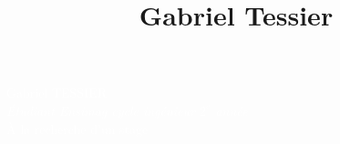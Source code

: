 \documentclass[11pt,oneside,a4paper,titlepage]{article}
\title{Gabriel Tessier}
\date{}
\begin{document}
\begin{tcolorbox}
  \begin{minipage}{4.5cm}
  \end{minipage}
  \begin{minipage}{15cm}
    \begin{center}
      \Huge{\textcolor{white}{Gabriel TESSIER}}\\
      \vspace*{0.5cm}
      \Large{\textcolor{white}{\emph{Étudiant Ensimag cycle ingénieur $2^{e}$ année}}}\\
      \vspace*{0.5cm}
      \textcolor{white}{À la recherche d'un stage}
    \end{center}
  \end{minipage}
\end{tcolorbox}
\end{document}
